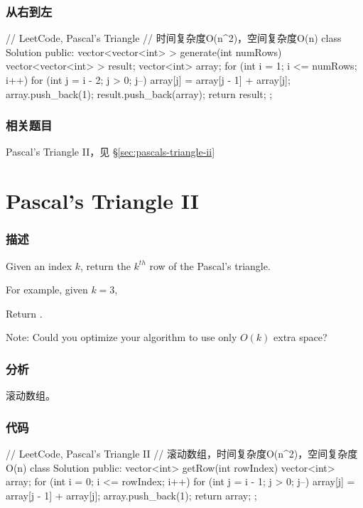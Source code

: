\subsubsection{从右到左}
\begin{Code}
// LeetCode, Pascal's Triangle
// 时间复杂度O(n^2)，空间复杂度O(n)
class Solution {
public:
    vector<vector<int> > generate(int numRows) {
        vector<vector<int> > result;
        vector<int> array;
        for (int i = 1; i <= numRows; i++) {
            for (int j = i - 2; j > 0; j--) {
                array[j] = array[j - 1] + array[j];
            }
            array.push_back(1);
            result.push_back(array);
        }
        return result;
    }
};
\end{Code}


\subsubsection{相关题目}
\begindot
\item Pascal's Triangle II，见 \S \ref{sec:pascals-triangle-ii}
\myenddot


\section{Pascal's Triangle II} %
\label{sec:pascal-s-triangle-ii}


\subsubsection{描述}
Given an index $k$, return the $k^{th}$ row of the Pascal's triangle.

For example, given $k = 3$,

Return \code{[1,3,3,1]}.

Note: Could you optimize your algorithm to use only $O(k)$ extra space?


\subsubsection{分析}
滚动数组。


\subsubsection{代码}

\begin{Code}
// LeetCode, Pascal's Triangle II
// 滚动数组，时间复杂度O(n^2)，空间复杂度O(n)
class Solution {
public:
	vector<int> getRow(int rowIndex) {
		vector<int> array;
		for (int i = 0; i <= rowIndex; i++) {
			for (int j = i - 1; j > 0; j--){
				array[j] = array[j - 1] + array[j];
			}
			array.push_back(1);
		}
		return array;
	}
};
\end{Code}


